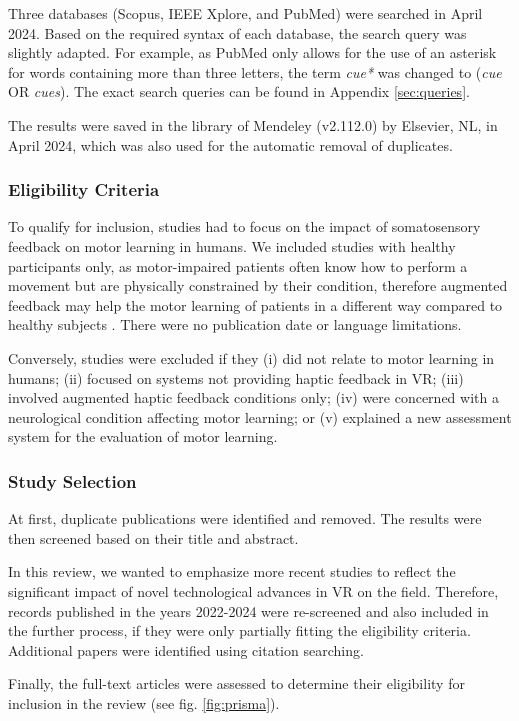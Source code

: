 Three databases (Scopus, IEEE Xplore, and PubMed) were searched in April 2024. Based on the required syntax of each database, the search query was slightly adapted. For example, as PubMed only allows for the use of an asterisk for words containing more than three letters, the term \textit{cue*} was changed to (\textit{cue} OR \textit{cues}). The exact search queries can be found in Appendix \ref{sec:queries}. 

The results were saved in the library of Mendeley (v2.112.0) by Elsevier, NL, in April 2024, which was also used for the automatic removal of duplicates. 

\subsubsection{Eligibility Criteria}
\label{sec:eligibility}
To qualify for inclusion, studies had to focus on the impact of somatosensory feedback on motor learning in humans. We included studies with healthy participants only, as motor-impaired patients often know how to perform a movement but are physically constrained by their condition, therefore augmented feedback may help the motor learning of patients in a different way compared to healthy subjects \cite{Sigrist2013AugmentedReview}. There were no publication date or language limitations.

Conversely, studies were excluded if they (i) did not relate to motor learning in humans; (ii) focused on systems not providing haptic feedback in VR; (iii) involved augmented haptic feedback conditions only; (iv) were concerned with a neurological condition affecting motor learning; or (v) explained a new assessment system for the evaluation of motor learning.

\subsubsection{Study Selection}
At first, duplicate publications were identified and removed. The results were then screened based on their title and abstract. 

In this review, we wanted to emphasize more recent studies to reflect the significant impact of novel technological advances in VR on the field. Therefore, records published in the years 2022-2024 were re-screened and also included in the further process, if they were only partially fitting the eligibility criteria. Additional papers were identified using citation searching.

Finally, the full-text articles were assessed to determine their eligibility for inclusion in the review (see fig. \ref{fig:prisma}).


